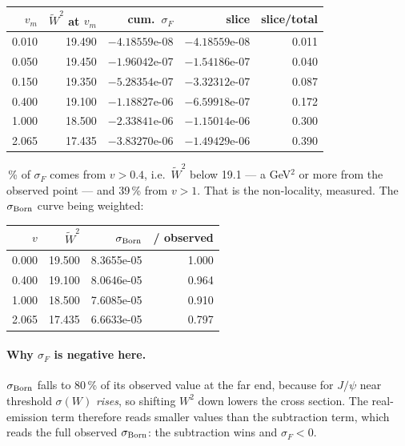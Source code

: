 \documentclass[11pt]{article}
\begin{document}
\begin{center}\small
\begin{tabular}{rrrrr}
\toprule
$v_m$ & $\tilde W^2$ at $v_m$ & cum.\ $\sigma_F$ & slice & slice/total \\
\midrule
0.010 & 19.490 & $-4.18559$e-08 & $-4.18559$e-08 & 0.011 \\
0.050 & 19.450 & $-1.96042$e-07 & $-1.54186$e-07 & 0.040 \\
0.150 & 19.350 & $-5.28354$e-07 & $-3.32312$e-07 & 0.087 \\
0.400 & 19.100 & $-1.18827$e-06 & $-6.59918$e-07 & 0.172 \\
1.000 & 18.500 & $-2.33841$e-06 & $-1.15014$e-06 & 0.300 \\
2.065 & 17.435 & $-3.83270$e-06 & $-1.49429$e-06 & 0.390 \\
\bottomrule
\end{tabular}
\end{center}

\,\% of $\sigma_F$ comes from $v>0.4$, i.e.\ $\tilde W^2$ below 19.1 --- a GeV$^2$ or
more from the observed point --- and 39\,\% from $v>1$. That is the non-locality, measured. The
$\sigma_{\rm Born}$ curve being weighted:

\begin{center}\small
\begin{tabular}{rrrr}
\toprule
$v$ & $\tilde W^2$ & $\sigma_{\rm Born}$ & / observed \\
\midrule
0.000 & 19.500 & 8.3655e-05 & 1.000 \\
0.400 & 19.100 & 8.0646e-05 & 0.964 \\
1.000 & 18.500 & 7.6085e-05 & 0.910 \\
2.065 & 17.435 & 6.6633e-05 & 0.797 \\
\bottomrule
\end{tabular}
\end{center}

\paragraph{Why $\sigma_F$ is negative here.} $\sigma_{\rm Born}$ falls to 80\,\% of its observed value
at the far end, because for $J/\psi$ near threshold $\sigma(W)$ \emph{rises}, so shifting $W^2$ down
lowers the cross section. The real-emission term therefore reads smaller values than the subtraction
term, which reads the full observed $\sigma_{\rm Born}$: the subtraction wins and $\sigma_F<0$.
\end{document}
